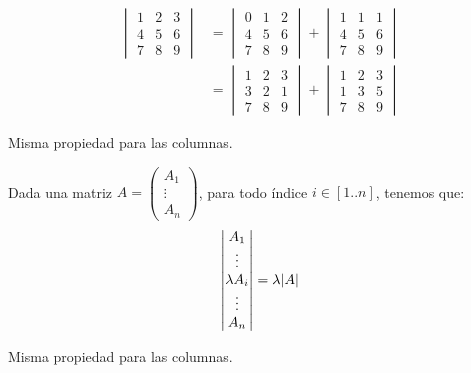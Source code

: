 \documentclass[11pt,a4paper]{article}
\begin{document}
\begin{ejemplo}
\begin{align*}
\begin{vmatrix}1&2&3\\4&5&6\\7&8&9\end{vmatrix}
&=\begin{vmatrix}0&1&2\\4&5&6\\7&8&9\end{vmatrix}
+\begin{vmatrix}1&1&1\\4&5&6\\7&8&9\end{vmatrix}\\
&=\begin{vmatrix}1&2&3\\3&2&1\\7&8&9\end{vmatrix}
+\begin{vmatrix}1&2&3\\1&3&5\\7&8&9\end{vmatrix}
\end{align*}
\end{ejemplo}

\begin{proposicion}
Misma propiedad para las columnas.
\end{proposicion}

\begin{proposicion}[Homogeneidad]
Dada una matriz $A=\begin{pmatrix}A_1\\\vdots\\A_n\end{pmatrix}$, para todo índice $i\in[1..n]$, tenemos que:
\[
\begin{vmatrix}A_1\\\vdots\\\lambda A_i\\\vdots\\A_n\end{vmatrix}=\lambda\lvert A\rvert
\]
\end{proposicion}

\begin{proposicion}
Misma propiedad para las columnas.
\end{proposicion}
\end{document}
